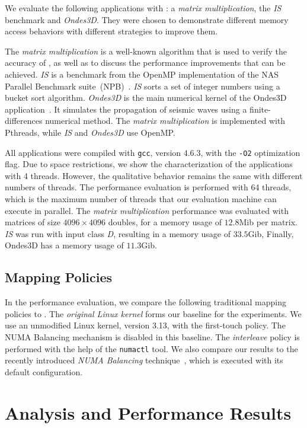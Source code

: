 We evaluate the following applications with \TABARNAC: a \emph{matrix multiplication}, the \emph{IS} benchmark and \emph{Ondes3D}.
They were chosen to demonstrate different memory access behaviors with different strategies to improve them.

The \emph{matrix multiplication} is a well-known algorithm that is used to verify the accuracy of \TABARNAC, as well as to discuss the performance improvements that can be achieved.
\emph{IS} is a benchmark from the OpenMP implementation of the NAS Parallel Benchmark suite~(NPB)~\cite{Jin1999}. \emph{IS} sorts a set of integer numbers using a bucket sort algorithm.
\emph{Ondes3D} is the main numerical kernel of the Ondes3D application~\cite{Dupros2008}. It simulates the propagation of seismic waves using a finite-differences numerical method.
The \emph{matrix multiplication} is implemented with Pthreads, while \emph{IS} and \emph{Ondes3D} use OpenMP.

All applications were compiled with \texttt{gcc}, version 4.6.3, with the \texttt{-O2} optimization flag.
Due to space restrictions, we show the characterization of the applications
with 4 threads. However, the qualitative behavior remains the same with different numbers of threads. The performance evaluation is performed with 64 threads,
which is the maximum number of threads that our evaluation machine can execute
in parallel. The \emph{matrix multiplication} performance was evaluated with
matrices of size $4096 \times 4096$ doubles, for a memory usage of $12.8$Mib per matrix. \emph{IS} was run
with input class \emph{D}, resulting in a memory usage of $33.5$Gib, Finally, Ondes3D has a memory usage of $11.3$Gib.

\subsection{Mapping Policies}

In the performance evaluation, we compare the following traditional mapping policies to \TABARNAC.
The \emph{original Linux kernel} forms our baseline for the experiments. We use an unmodified Linux kernel, version 3.13, with the first-touch policy. The NUMA Balancing mechanism is disabled in this baseline.
The \emph{interleave} policy is performed with the help of the \texttt{numactl} tool.
We also compare our results to the recently introduced \emph{NUMA Balancing} technique~\cite{Corbet}, which is executed with its default configuration.


\section{Analysis and Performance Results}
\label{sec:expe-analysis}

